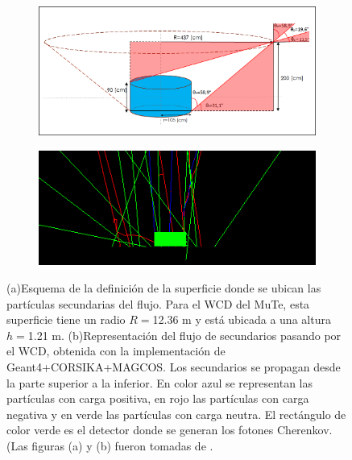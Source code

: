 \documentclass[12pt,oneside,openany,letter]{book}
\begin{document}
\begin{figure}[h]
\begin{center}

\begin{subfigure}{0.7\textwidth}
\includegraphics[width=\textwidth]{images/andrei1.png}
\caption{}
\label{andrei1}
\end{subfigure}

\begin{subfigure}{0.7\textwidth}
\includegraphics[width=\textwidth]{images/andrei2.png}
\caption{}
\label{andrei2}
\end{subfigure}
\end{center}

 \caption[Ubicaci\'on y propagaci\'on del flujo de secundarios sobre un WCD]{(a)Esquema de la definici\'on de la superficie donde se ubican las part\'iculas secundarias del flujo. Para el WCD del MuTe, esta superficie tiene un radio $R=$12.36 m y est\'a ubicada a una altura $h=$1.21 m. (b)Representaci\'on del flujo de secundarios pasando por el WCD, obtenida con la implementaci\'on de Geant4+CORSIKA+MAGCOS. Los secundarios se propagan desde la parte superior a la inferior. En color azul se representan las part\'iculas con carga positiva, en rojo las part\'iculas con carga negativa y
en verde las part\'iculas con carga neutra. El rect\'angulo de color verde es el detector donde se generan los fotones Cherenkov. (Las figuras (a) y (b) fueron tomadas de \cite{JaimesMotta2018}.}
  \label{figura1}
\end{figure}
\end{document}
